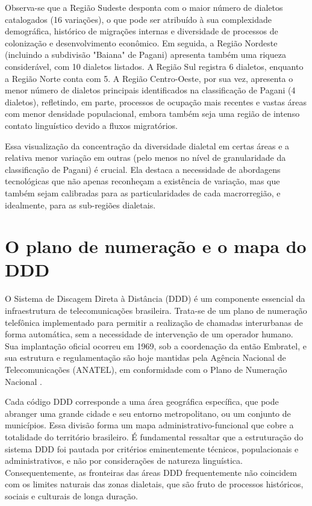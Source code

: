 Observa-se que a Região Sudeste desponta com o maior número de dialetos catalogados (16 variações), o que pode ser atribuído à sua complexidade demográfica, histórico de migrações internas e diversidade de processos de colonização e desenvolvimento econômico. Em seguida, a Região Nordeste (incluindo a subdivisão "Baiana" de Pagani) apresenta também uma riqueza considerável, com 10 dialetos listados. A Região Sul registra 6 dialetos, enquanto a Região Norte conta com 5. A Região Centro-Oeste, por sua vez, apresenta o menor número de dialetos principais identificados na classificação de Pagani (4 dialetos), refletindo, em parte, processos de ocupação mais recentes e vastas áreas com menor densidade populacional, embora também seja uma região de intenso contato linguístico devido a fluxos migratórios.

Essa visualização da concentração da diversidade dialetal em certas áreas e a relativa menor variação em outras (pelo menos no nível de granularidade da classificação de Pagani) é crucial. Ela destaca a necessidade de abordagens tecnológicas que não apenas reconheçam a existência de variação, mas que também sejam calibradas para as particularidades de cada macrorregião, e idealmente, para as sub-regiões dialetais.









\section{O plano de numeração e o mapa do DDD}


O Sistema de Discagem Direta à Distância (DDD) é um componente essencial da infraestrutura de telecomunicações brasileira. Trata-se de um plano de numeração telefônica implementado para permitir a realização de chamadas interurbanas de forma automática, sem a necessidade de intervenção de um operador humano. Sua implantação oficial ocorreu em 1969, sob a coordenação da então Embratel, e sua estrutura e regulamentação são hoje mantidas pela Agência Nacional de Telecomunicações (ANATEL), em conformidade com o Plano de Numeração Nacional \cite{anatel_pnb, felipe_embratel_2005}.

Cada código DDD corresponde a uma área geográfica específica, que pode abranger uma grande cidade e seu entorno metropolitano, ou um conjunto de municípios. Essa divisão forma um mapa administrativo-funcional que cobre a totalidade do território brasileiro. É fundamental ressaltar que a estruturação do sistema DDD foi pautada por critérios eminentemente técnicos, populacionais e administrativos, e não por considerações de natureza linguística. Consequentemente, as fronteiras das áreas DDD frequentemente não coincidem com os limites naturais das zonas dialetais, que são fruto de processos históricos, sociais e culturais de longa duração.


